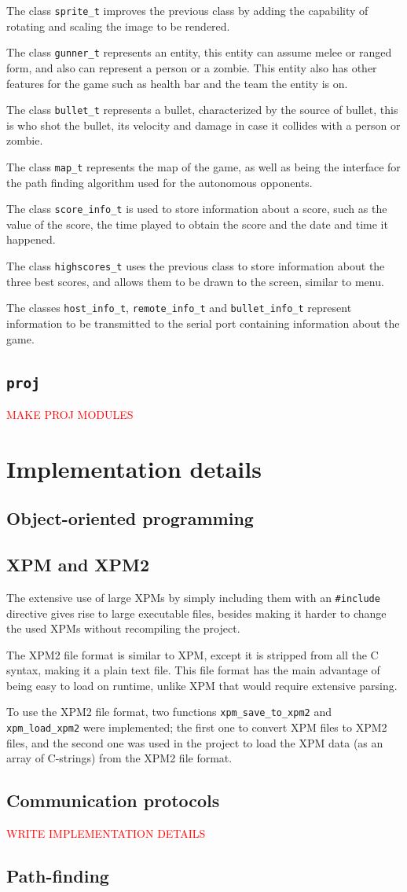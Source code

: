 \documentclass{article}
\theoremstyle{remark}
\begin{document}
The class \texttt{sprite\_t} improves the previous class by adding the capability of rotating and scaling the image to be rendered.\par
The class \texttt{gunner\_t} represents an entity, this entity can assume melee or ranged form, and also can represent a person or a zombie. This entity also has other features for the game such as health bar and the team the entity is on.\par
The class \texttt{bullet\_t} represents a bullet, characterized by the source of bullet, this is who shot the bullet, its velocity and damage in case it collides with a person or zombie.\par
The class \texttt{map\_t} represents the map of the game, as well as being the interface for the path finding algorithm used for the autonomous opponents.\par
The class \texttt{score\_info\_t} is used to store information about a score, such as the value of the score, the time played to obtain the score and the date and time it happened.\par
The class \texttt{highscores\_t} uses the previous class to store information about the three best scores, and allows them to be drawn to the screen, similar to menu.\par
The classes \texttt{host\_info\_t}, \texttt{remote\_info\_t} and \texttt{bullet\_info\_t} represent information to be transmitted to the serial port containing information about the game.
\newpage
\subsection{\texttt{proj}}
\textcolor{red}{MAKE PROJ MODULES}
\section{Implementation details} \label{sec:details}
\subsection{Object-oriented programming}
\subsection{XPM and XPM2}
The extensive use of large XPMs by simply including them with an \texttt{\#include} directive gives rise to large executable files, besides making it harder to change the used XPMs without recompiling the project.\par
The XPM2 file format is similar to XPM, except it is stripped from all the C syntax, making it a plain text file. This file format has the main advantage of being easy to load on runtime, unlike XPM that would require extensive parsing.\par
To use the XPM2 file format, two functions \texttt{xpm\_save\_to\_xpm2} and \texttt{xpm\_load\_xpm2} were implemented; the first one to convert XPM files to XPM2 files, and the second one was used in the project to load the XPM data (as an array of C-strings) from the XPM2 file format.
\subsection{Communication protocols}
\textcolor{red}{WRITE IMPLEMENTATION DETAILS}
\subsection{Path-finding}
\end{document}
